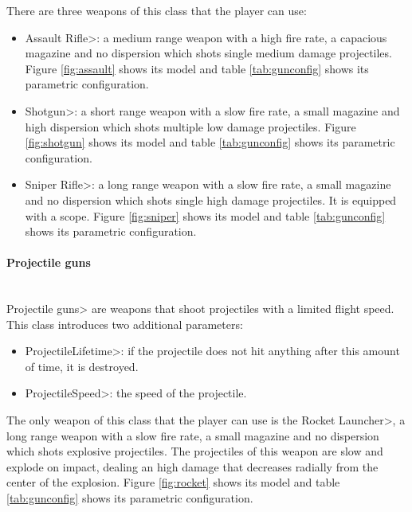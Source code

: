 \par

There are three weapons of this class that the player can use:

\begin{itemize}
\item \<Assault Rifle>: a medium range weapon with a high fire rate, a capacious magazine and no dispersion which shots single medium damage projectiles. Figure \ref{fig:assault} shows its model and table \ref{tab:gunconfig} shows its parametric configuration.
\item \<Shotgun>: a short range weapon with a slow fire rate, a small magazine and high dispersion which shots multiple low damage projectiles. Figure \ref{fig:shotgun} shows its model and table \ref{tab:gunconfig} shows its parametric configuration.
\item \<Sniper Rifle>: a long range weapon with a slow fire rate, a small magazine and no dispersion which shots single high damage projectiles. It is equipped with a scope. Figure \ref{fig:sniper} shows its model and table \ref{tab:gunconfig} shows its parametric configuration.
\end{itemize}

\paragraph{Projectile guns}

\mbox{}\\

{\setlength{\parindent}{0cm}
\<Projectile guns> are weapons that shoot projectiles with a limited flight speed. This class introduces two additional parameters:
}

\begin{itemize}
\item \<ProjectileLifetime>: if the projectile does not hit anything after this amount of time, it is destroyed.
\item \<ProjectileSpeed>: the speed of the projectile.
\end{itemize}

The only weapon of this class that the player can use is the \<Rocket Launcher>, a long range weapon with a slow fire rate, a small magazine and no dispersion which shots explosive projectiles. The projectiles of this weapon are slow and explode on impact, dealing an high damage that decreases radially from the center of the explosion. Figure \ref{fig:rocket} shows its model and table \ref{tab:gunconfig} shows its parametric configuration.

